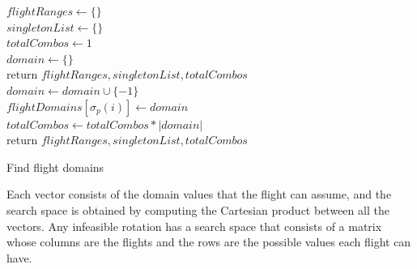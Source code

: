 		\begin{algorithm}[H]
		\DontPrintSemicolon
		$flightRanges \gets \{\}$\\
		$singletonList \gets \{\}$\\
		$totalCombos \gets 1$\\
		{
			$domain \gets \{\}$\\
				{return $flightRanges, singletonList, totalCombos$\\}
			$domain \gets domain \cup \{-1\}$\\ %
			$flightDomains[\sigma_p(i)] \gets domain$\\
			$totalCombos \gets totalCombos * |domain|$\\
		}
		return $flightRanges, singletonList, totalCombos$
		\caption{Find flight domains}
		\label{algo:flightDomains}
	\end{algorithm}

\vspace{\baselineskip}
	
Each vector consists of the domain values that the flight can assume, and the search space is obtained by computing the Cartesian product between all the vectors. Any infeasible rotation has a search space that consists of a matrix whose columns are the flights and the rows are the possible values each flight can have.\\
 	
